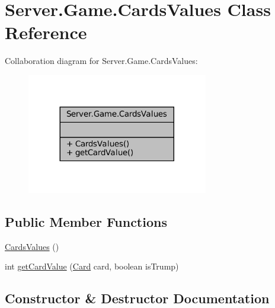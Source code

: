 \hypertarget{classServer_1_1Game_1_1CardsValues}{}\section{Server.\+Game.\+Cards\+Values Class Reference}
\label{classServer_1_1Game_1_1CardsValues}


Collaboration diagram for Server.\+Game.\+Cards\+Values\+:
\nopagebreak
\begin{figure}[H]
\begin{center}
\leavevmode
\includegraphics[width=224pt]{classServer_1_1Game_1_1CardsValues__coll__graph}
\end{center}
\end{figure}
\subsection*{Public Member Functions}
\begin{DoxyCompactItemize}
\item 
\mbox{\hyperlink{classServer_1_1Game_1_1CardsValues_a634d4777af4a21205f3ca33caa22e958}{Cards\+Values}} ()
\item 
int \mbox{\hyperlink{classServer_1_1Game_1_1CardsValues_a9565f977853cc769004d989b3f9524c6}{get\+Card\+Value}} (\mbox{\hyperlink{classCommon_1_1Card}{Card}} card, boolean is\+Trump)
\end{DoxyCompactItemize}


\subsection{Constructor \& Destructor Documentation}
\mbox{\label{classServer_1_1Game_1_1CardsValues_a634d4777af4a21205f3ca33caa22e958}} 

